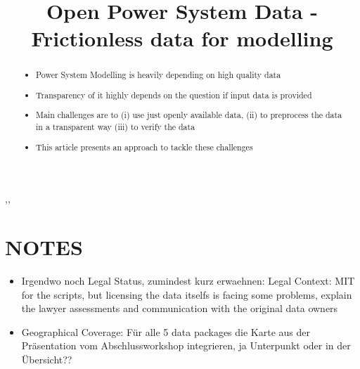 \documentclass[article]{elsarticle}
\begin{document}
\begin{frontmatter}

\title{Open Power System Data - Frictionless data for modelling}

\begin{abstract}
\begin{itemize}
    \item Power System Modelling is heavily depending on high quality data
    \item Transparency of it highly depends on the question if input data is provided
    \item Main challenges are to (i) use just openly available data, (ii) to preprocess the data in a transparent way (iii) to verify the data
     \item This article presents an approach to tackle these challenges
\end{itemize}
\end{abstract}

\begin{keyword}
\sep \sep 
\end{keyword}

\end{frontmatter}

\linenumbers

\section*{NOTES}
\begin{itemize}
    \item Irgendwo noch Legal Status, zumindest kurz erwaehnen: Legal Context: MIT for the scripts, but licensing the data itselfs is facing some problems, explain the lawyer assessments and communication with the original data owners
    \item Geographical Coverage: Für alle 5 data packages die Karte aus der Präsentation vom Abschlussworkshop integrieren, ja Unterpunkt oder in der Übersicht??
\end{itemize}
\end{document}
